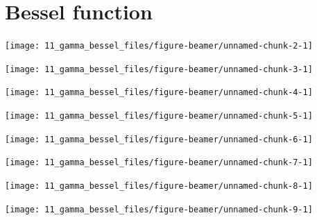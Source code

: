 \documentclass[
  ignorenonframetext,
]{beamer}
\begin{document}
\hypertarget{bessel-function}{%
\section{Bessel function}\label{bessel-function}}

\begin{frame}{}
\protect\hypertarget{section-1}{}
\begin{center}\texttt{[image: 11\_gamma\_bessel\_files/figure-beamer/unnamed-chunk-2-1]} \end{center}
\end{frame}

\begin{frame}{}
\protect\hypertarget{section-2}{}
\begin{center}\texttt{[image: 11\_gamma\_bessel\_files/figure-beamer/unnamed-chunk-3-1]} \end{center}
\end{frame}

\begin{frame}{}
\protect\hypertarget{section-3}{}
\begin{center}\texttt{[image: 11\_gamma\_bessel\_files/figure-beamer/unnamed-chunk-4-1]} \end{center}
\end{frame}

\begin{frame}{}
\protect\hypertarget{section-4}{}
\begin{center}\texttt{[image: 11\_gamma\_bessel\_files/figure-beamer/unnamed-chunk-5-1]} \end{center}
\end{frame}

\begin{frame}{}
\protect\hypertarget{section-5}{}
\begin{center}\texttt{[image: 11\_gamma\_bessel\_files/figure-beamer/unnamed-chunk-6-1]} \end{center}
\end{frame}

\begin{frame}{}
\protect\hypertarget{section-6}{}
\begin{center}\texttt{[image: 11\_gamma\_bessel\_files/figure-beamer/unnamed-chunk-7-1]} \end{center}
\end{frame}

\begin{frame}{}
\protect\hypertarget{section-7}{}
\begin{center}\texttt{[image: 11\_gamma\_bessel\_files/figure-beamer/unnamed-chunk-8-1]} \end{center}
\end{frame}

\begin{frame}{}
\protect\hypertarget{section-8}{}
\begin{center}\texttt{[image: 11\_gamma\_bessel\_files/figure-beamer/unnamed-chunk-9-1]} \end{center}
\end{frame}
\end{document}
